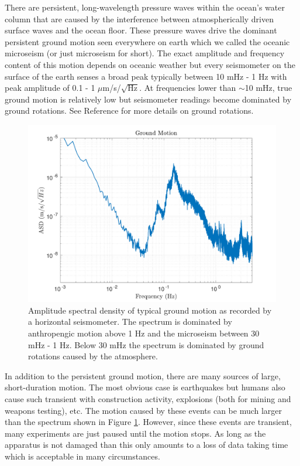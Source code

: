 \documentclass{book}
\begin{document}
There are persistent, long-wavelength pressure waves within the ocean's water column that are caused by the interference between atmospherically driven surface waves and the ocean floor. These pressure waves drive the dominant persistent ground motion seen everywhere on earth which we called the oceanic microseism (or just microseism for short). The exact amplitude and frequency content of this motion depends on oceanic weather but every seismometer on the surface of the earth senses a broad peak typically between 10 mHz - 1 Hz with peak amplitude of 0.1 - 1 $\mu$m/s/$\sqrt{\text{Hz}}$. At frequencies lower than $\sim$10 mHz, true ground motion is relatively low but seismometer readings become dominated by ground rotations. See Reference \cite{ross2020precision} for more details on ground rotations.

\begin{figure}[!h]
\begin{centering}
\includegraphics[width=\textwidth]{GroundSpectrum.pdf}
\caption{Amplitude spectral density of typical ground motion as recorded by a horizontal seismometer. \cite{ross2020precision} The spectrum is dominated by anthropengic motion above 1 Hz and the microseism between 30 mHz - 1 Hz. Below 30 mHz the spectrum is dominated by ground rotations caused by the atmosphere.}\label{groundSpec}
\end{centering}
\end{figure}

In addition to the persistent ground motion, there are many sources of large, short-duration motion. The most obvious case is earthquakes but humans also cause such transient with construction activity, explosions (both for mining and weapons testing), etc. The motion caused by these events can be much larger than the spectrum shown in Figure \ref{groundSpec}. However, since these events are transient, many experiments are just paused until the motion stops. As long as the apparatus is not damaged than this only amounts to a loss of data taking time which is acceptable in many circumstances.
\end{document}
